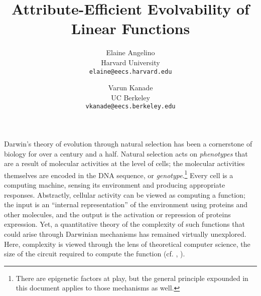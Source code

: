 \documentclass{acmtr2e}
\begin{document}
\title{Attribute-Efficient Evolvability of Linear Functions} 

\author{
Elaine Angelino \\ Harvard University \\ \texttt{elaine@eecs.harvard.edu} 
\and 
Varun Kanade \\ UC Berkeley \\ \texttt{vkanade@eecs.berkeley.edu}
}

\maketitle

Darwin's theory of evolution through natural selection has been a cornerstone of
biology for over a century and a half.  Natural selection acts on
\emph{phenotypes} that are a result of molecular activities at the level of
cells; the molecular activities themselves are encoded in the DNA sequence, or
\emph{genotype}.\footnote{There are epigenetic factors at play, but the general
principle expounded in this document applies to those mechanisms as well.}
Every cell is a computing machine, sensing its environment and producing
appropriate responses.  Abstractly, cellular activity can be viewed as computing
a function; the input is an ``internal representation'' of the environment using
proteins and other molecules, and the output is the activation or repression
of proteins expression. Yet, a quantitative theory of the complexity of such
functions that could arise through Darwinian mechanisms has remained virtually
unexplored. Here, complexity is viewed through the lens of theoretical
computer science, \eg the size of the circuit required to compute the
function (cf. ,
).
\end{document}
